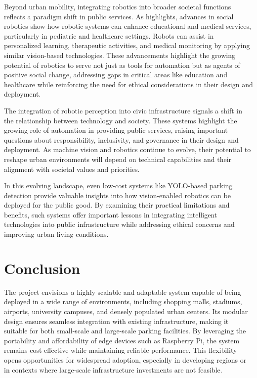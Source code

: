 \documentclass[conference]{IEEEtran}
\begin{document}
Beyond urban mobility, 
integrating robotics into broader societal functions reflects a paradigm shift in public services. 
As \cite{social_robotics} highlights, 
advances in social robotics show how robotic systems can enhance educational and medical services, 
particularly in pediatric and healthcare settings. 
Robots can assist in personalized learning, 
therapeutic activities, 
and medical monitoring by applying similar vision-based technologies. 
These advancements highlight the growing potential of robotics to serve not just as tools for automation but as agents of positive social change, 
addressing gaps in critical areas like education and healthcare while reinforcing the need for ethical considerations in their design and deployment.

The integration of robotic perception into civic infrastructure signals a shift in the relationship between technology and society. 
These systems highlight the growing role of automation in providing public services, 
raising important questions about responsibility, 
inclusivity, 
and governance in their design and deployment. 
As machine vision and robotics continue to evolve, 
their potential to reshape urban environments will depend on technical capabilities and their alignment with societal values and priorities.

In this evolving landscape, 
even low-cost systems like YOLO-based parking detection provide valuable insights into how vision-enabled robotics can be deployed for the public good. 
By examining their practical limitations and benefits, 
such systems offer important lessons in integrating intelligent technologies into public infrastructure while addressing ethical concerns and improving urban living conditions.

\section{Conclusion}

The project envisions a highly scalable and adaptable system capable of being deployed in a wide range of environments, 
including shopping malls, 
stadiums, 
airports, 
university campuses, 
and densely populated urban centers. 
Its modular design ensures seamless integration with existing infrastructure, 
making it suitable for both small-scale and large-scale parking facilities. 
By leveraging the portability and affordability of edge devices such as Raspberry Pi, 
the system remains cost-effective while maintaining reliable performance. 
This flexibility opens opportunities for widespread adoption, 
especially in developing regions or in contexts where large-scale infrastructure investments are not feasible.
\end{document}
